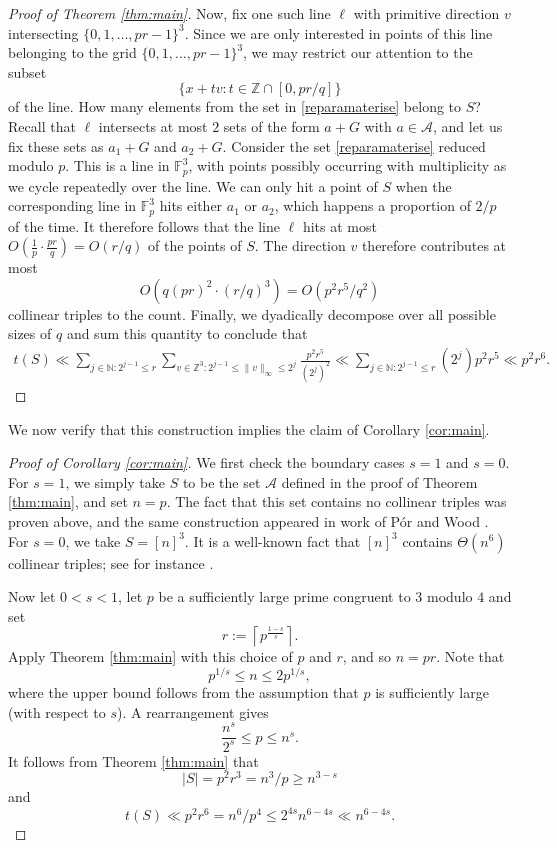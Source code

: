 \documentclass[11pt]{amsart}
\theoremstyle{remark}
\begin{document}
\begin{proof}[Proof of Theorem \ref{thm:main}]
Now, fix one such line $\ell$ with primitive direction $v$ intersecting $\{0,1,\dots, pr-1\}^3$. Since we are only interested in points of this line belonging to the grid $\{0,1,\dots, pr-1\}^3$, we may restrict our attention to the subset
\begin{equation} \label{reparamaterise}
    \{x+tv: t \in \mathbb Z \cap [0,pr/q]  \}
\end{equation}
of the line. How many elements from the set in \eqref{reparamaterise} belong to $S$? Recall that $\ell$ intersects at most $2$ sets of the form $a+G$ with $a \in \mathcal A$, and let us fix these sets as $a_1+G$ and $a_2+G$. Consider the set \eqref{reparamaterise} reduced modulo $p$. This is a line in $\mathbb F_p^3$, with points possibly occurring with multiplicity as we cycle repeatedly over the line. We can only hit a point of $S$ when the corresponding line in $\mathbb F_p^3$ hits either $a_1$ or $a_2$, which happens a proportion of $2/p$ of the time. It therefore follows that the line $\ell$ hits at most $O\left ( \frac{1}{p} \cdot \frac{pr}{q} \right )=O(r/q)$ of the points of $S$. The direction $v$ therefore contributes at most
\[
O(q(pr)^2 \cdot (r/q)^3) = O(p^2r^5/q^2)
\]
collinear triples to the count. Finally, we dyadically decompose over all possible sizes of $q$ and sum this quantity to conclude that
\begin{align*}
    t(S) \ll \sum_{j \in \mathbb N : 2^{j-1} \leq r} \sum_{v \in \mathbb Z^3 : 2^{j-1} \leq \|v\|_{\infty}\leq 2^{j}}  \frac{p^2r^5}{(2^j)^2} \ll \sum_{j \in \mathbb N : 2^{j-1} \leq r}(2^j)p^2r^5 \ll p^2r^6.
\end{align*}

\end{proof}

We now verify that this construction implies the claim of Corollary \ref{cor:main}.

\begin{proof}[Proof of Corollary \ref{cor:main}]
    We first check the boundary cases $s=1$ and $s=0$. For $s=1$, we simply take $S$ to be the set $\mathcal A$ defined in the proof of Theorem \ref{thm:main}, and set $n=p$. The fact that this set contains no collinear triples was proven above, and the same construction appeared in work of P\'{o}r and Wood \cite{PoWo}. For $s=0$, we take $S=[n]^3$. It is a well-known fact that $[n]^3$ contains $\Theta(n^6)$ collinear triples; see for instance \cite[Claim 4.1]{BaSo}.

    Now let $0 < s < 1$, let $p$ be a sufficiently large prime congruent to $3$ modulo $4$ and set
    \[
    r:=  \left \lceil p^{\frac{1-s}{s}} \right \rceil.
    \]
    Apply Theorem \ref{thm:main} with this choice of $p$ and $r$, and so $n=pr$. Note that
    \[
    p^{1/s} \leq n \leq 2 p^{1/s},
    \]
    where the upper bound follows from the assumption that $p$ is sufficiently large (with respect to $s$). A rearrangement gives
    \[
    \frac{n^{s}}{2^s} \leq p \leq n^s.
    \]
    It follows from Theorem \ref{thm:main} that
    \[
    |S|=p^2r^3=n^3/p \geq n^{3-s}
    \]
    and
    \[
    t(S) \ll p^2r^6= n^6/p^4 \leq 2^{4s}n^{6-4s} \ll n^{6-4s}.
    \]
\end{proof}
\end{document}

